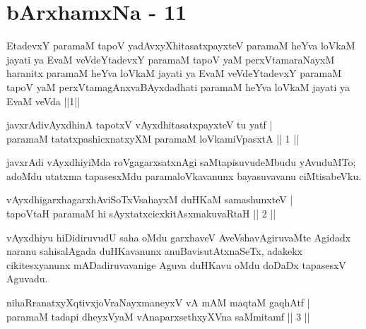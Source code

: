 \chapter{bArxhamxNa - 11}

\begin{shl}
EtadevxY paramaM tapoV yadAvxyXhitasatxpayxteV paramaM heYva loVkaM jayati ya EvaM veVdeYtadevxY paramaM tapoV yaM perxVtamaraNayxM haranitx paramaM heYva loVkaM jayati ya EvaM veVdeYtadevxY paramaM tapoV yaM perxVtamagAnxvaBAyxdadhati paramaM heYva loVkaM jayati ya EvaM veVda ||1||
\end{shl}



\begin{shl}
javxrAdivAyxdhinA tapotxV vAyxdhitasatxpayxteV tu yatf | \\
paramaM tatatxpashicxnatxyXM paramaM loVkamiVpasxtA \hfill ||  1 ||
\end{shl}

\begin{artha}
javxrAdi vAyxdhiyiMda roVgagarxsatxnAgi saMtapisuvudeMbudu yAvuduMTo; adoMdu utatxma tapasesxMdu paramaloVkavanunx bayasuvavanu ciMtisabeVku.
\end{artha}


\begin{shl}
vAyxdhigarxhagarxhAviSoTxV\s sahayxM duHKaM samashunxteV | \\
tapoV\s taH paramaM hi sAyxtatxcicxkitAsxmakuvaRtaH \hfill ||  2 || 
\end{shl}

\begin{artha}
vAyxdhiyu hiDidiruvudU saha oMdu garxhaveV AveVshavAgiruvaMte Agidadx naranu sahisalAgada duHKavanunx anuBavisutAtxnaSeTx, adakekx cikitesxyanunx mADadiruvavanige Aguva duHKavu oMdu doDaDx tapasesxV Aguvadu.
\end{artha}


\begin{shl}
nihaRranatxyXqtivxjoV\s raNayxmaneyxV vA mAM maqtaM gaqhAtf | \\
paramaM tadapi dheyxVyaM vAnaparxsethxyXVna saMmitamf \hfill ||  3 || 
\end{shl}


